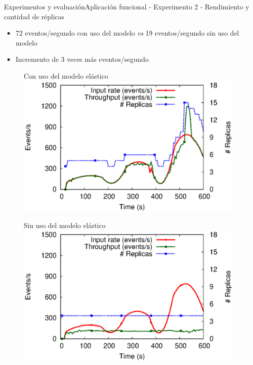 \begin{frame}{Experimentos y evaluación}{Aplicación funcional - Experimento 2 - Rendimiento y cantidad de réplicas}

\begin{itemize}
\item 72 eventos/segundo con uso del modelo \textit{vs} 19 eventos/segundo sin uso del modelo
\item Incremento de 3 veces más eventos/segundo
\end{itemize}

\begin{multicols}{2}
\begin{figure}[p]
	\centering
	{\scriptsize Con uso del modelo elástico\\}
	\includegraphics[scale=0.4]{images/exp/app1/dynamic/adaptative/exp2-processSystem.eps}
\end{figure}

\begin{figure}[p]
	\centering
	{\scriptsize Sin uso del modelo elástico\\}
	\includegraphics[scale=0.4]{images/exp/app1/dynamic/baseline/exp2-processSystem.eps}
\end{figure}
\end{multicols}
\end{frame}

